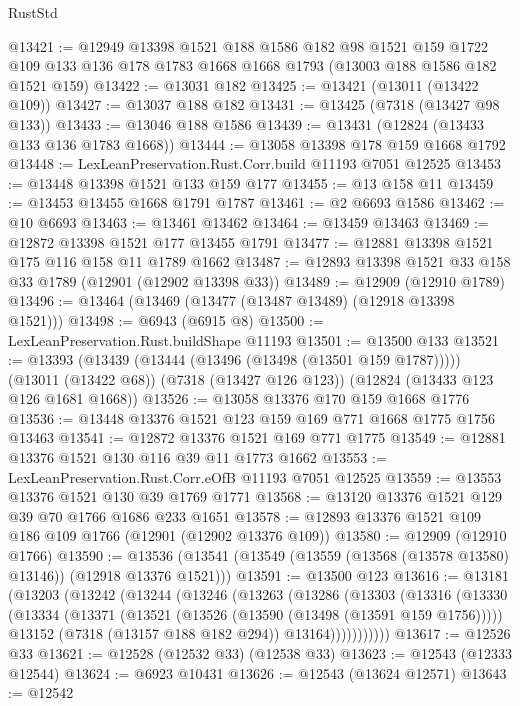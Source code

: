 \begin{lexlean}{RustStd}
\begin{coremodule}
@13421 := @12949
    @13398
    @1521
    @188
    @1586
    @182
    @98
    @1521
    @159
    @1722
    @109
    @133
    @136
    @178
    @1783
    @1668
    @1668
    @1793
    (@13003 @188 @1586 @182 @1521 @159)
@13422 := @13031 @182
@13425 := @13421 (@13011 (@13422 @109))
@13427 := @13037 @188 @182
@13431 := @13425 (@7318 (@13427 @98 @133))
@13433 := @13046 @188 @1586
@13439 := @13431 (@12824 (@13433 @133 @136 @1783 @1668))
@13444 := @13058 @13398 @178 @159 @1668 @1792
@13448 := LexLeanPreservation.Rust.Corr.build @11193 @7051 @12525
@13453 := @13448 @13398 @1521 @133 @159 @177
@13455 := @13 @158 @11
@13459 := @13453 @13455 @1668 @1791 @1787
@13461 := @2 @6693 @1586
@13462 := @10 @6693
@13463 := @13461 @13462
@13464 := @13459 @13463
@13469 := @12872 @13398 @1521 @177 @13455 @1791
@13477 := @12881 @13398 @1521 @175 @116 @158 @11 @1789 @1662
@13487 := @12893 @13398 @1521 @33 @158 @33 @1789 (@12901 (@12902 @13398 @33))
@13489 := @12909 (@12910 @1789)
@13496 := @13464 (@13469 (@13477 (@13487 @13489) (@12918 @13398 @1521)))
@13498 := @6943 (@6915 @8)
@13500 := LexLeanPreservation.Rust.buildShape @11193
@13501 := @13500 @133
@13521 := @13393
    (@13439 (@13444 (@13496 (@13498 (@13501 @159 @1787)))))
    (@13011 (@13422 @68))
    (@7318 (@13427 @126 @123))
    (@12824 (@13433 @123 @126 @1681 @1668))
@13526 := @13058 @13376 @170 @159 @1668 @1776
@13536 := @13448 @13376 @1521 @123 @159 @169 @771 @1668 @1775 @1756 @13463
@13541 := @12872 @13376 @1521 @169 @771 @1775
@13549 := @12881 @13376 @1521 @130 @116 @39 @11 @1773 @1662
@13553 := LexLeanPreservation.Rust.Corr.eOfB @11193 @7051 @12525
@13559 := @13553 @13376 @1521 @130 @39 @1769 @1771
@13568 := @13120 @13376 @1521 @129 @39 @70 @1766 @1686 @233 @1651
@13578 := @12893 @13376 @1521 @109 @186 @109 @1766 (@12901 (@12902 @13376 @109))
@13580 := @12909 (@12910 @1766)
@13590 := @13536 (@13541 (@13549 (@13559 (@13568 (@13578 @13580) @13146)) (@12918 @13376 @1521)))
@13591 := @13500 @123
@13616 := @13181
    (@13203
      (@13242
        (@13244
          (@13246
            (@13263
              (@13286
                (@13303
                  (@13316
                    (@13330
                      (@13334
                        (@13371
                          (@13521 (@13526 (@13590 (@13498 (@13591 @159 @1756)))))
                          @13152
                          (@7318 (@13157 @188 @182 @294))
                          @13164)))))))))))
@13617 := @12526 @33
@13621 := @12528 (@12532 @33) (@12538 @33)
@13623 := @12543 (@12333 @12544)
@13624 := @6923 @10431
@13626 := @12543 (@13624 @12571)
@13643 := @12542

\end{coremodule}
\end{lexlean}
